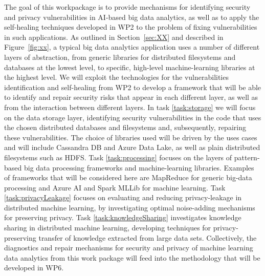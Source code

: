 \begin{Workpackage}{\thewpno}
\begin{WPDescription}
The goal of this workpackage is to provide mechanisms for identifying security and privacy vulnerabilities in AI-based big data analytics, as well as to apply the self-healing techniques developed in WP2 to the problem of fixing vulnerabilities in such applications. As outlined in Section~\ref{sec:XX} and described in Figure~\ref{fig:xx}, a typical big data analytics application uses a number of different layers of abstraction, from generic libraries for distributed filesystems and databases at the lowest level, to specific, high-level machine-learning libraries at the highest level. We will exploit the technologies for the vulnerabilities identification and self-healing from WP2 to develop a framework that will be able to identify and repair security risks that appear in each different layer, as well as from the interaction between different layers. In task \ref{task:storage} we will focus on the data storage layer, identifying security vulnerabilities in the code that uses the chosen distributed databases and filesystems and, subsequently, repairing these vulnerabilities. The choice of libraries used will be driven by the uses cases and will include Cassandra DB and Azure Data Lake, as well as plain distributed filesystems such as HDFS. Task \ref{task:processing} focuses on the layers of pattern-based big data processing frameworks and machine-learning libraries. Examples of frameworks that will be considered here are MapReduce for generic big-data processing and Azure AI and Spark MLLib for machine learning. Task \ref{task:privacyLeakage} focuses on evaluating and reducing privacy-leakage in distributed machine learning, by investigating optimal noise-adding mechanisms for preserving privacy. Task \ref{task:knowledgeSharing} investigates knowledge sharing in distributed machine learning, developing techniques for privacy-preserving transfer of knowledge extracted from large data sets. Collectively, the diagnostics and repair mechanisms for security and privacy of machine learning data analytics from this work package will feed into the \TheProject{} methodology that will be developed in WP6.


\end{WPDescription}
\end{Workpackage}
